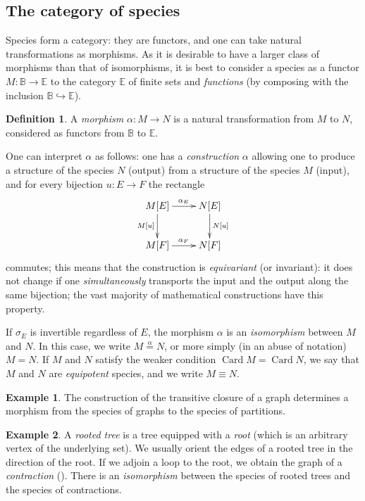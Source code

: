 \documentclass{amsart}
\theoremstyle{definition}
\newtheorem{defn}[thm]{Definition}
\newtheorem{ex}{Example}
\theoremstyle{remark}
\newcommand{\B}{\mathbb{B}}
\newcommand{\E}{\mathbb{E}}
\newcommand{\inj}{\hookrightarrow}
\DeclareMathOperator{\Card}{Card}
\newcommand{\pref}[1]{\prettyref{#1}}
\begin{document}
\subsection{The category of species}
\label{sec:category-of-species}

Species form a category: they are functors, and one can take natural
transformations as morphisms. As it is desirable to have a larger
class of morphisms than that of isomorphisms, it is best to consider a
species as a functor $M: \B \to \E$ to the category $\E$ of finite
sets and \emph{functions} (by composing with the inclusion $\B \inj
\E$).

\begin{defn}
  A \emph{morphism} $\alpha : M \to N$ is a natural transformation
  from $M$ to $N$, considered as functors from $\B$ to $\E$.
\end{defn}

One can interpret $\alpha$ as follows: one has a \emph{construction}
$\alpha$ allowing one to produce a structure of the species $N$
(output) from a structure of the species $M$ (input), and for every
bijection $u : E \to F$ the rectangle \[ \xymatrix{M[E]
  \ar[r]^{\alpha_E} \ar[d]_{M[u]} & N[E] \ar[d]^{N[u]} \\ M[F]
  \ar[r]^{\alpha_F} & N[F] } \] commutes; this means that the
construction is \emph{equivariant} (or invariant): it does not change
if one \emph{simultaneously} transports the input and the output along
the same bijection; the vast majority of mathematical constructions
have this property.

If $\sigma_E$ is invertible regardless of $E$, the morphism $\alpha$
is an \emph{isomorphism} between $M$ and $N$. In this case, we write
$M \stackrel{\alpha}{=} N$, or more simply (in an abuse of notation) $M
= N$. If $M$ and $N$ satisfy the weaker condition $\Card M = \Card N$,
we say that $M$ and $N$ are \emph{equipotent} species, and we write $M
\equiv N$.

\begin{ex}
  The construction of the transitive closure of a graph determines a
  morphism from the species of graphs to the species of partitions.
\end{ex}

\begin{ex} \label{ex:rooted-tree}
  A \emph{rooted tree} is a tree equipped with a \emph{root} (which is
  an arbitrary vertex of the underlying set). We usually orient the
  edges of a rooted tree in the direction of the root. If we adjoin a
  loop to the root, we obtain the graph of a \emph{contraction}
  (\pref{ex:endofunctions}). There is an \emph{isomorphism} between
  the species of rooted trees and the species of contractions.
\end{ex}
\end{document}
